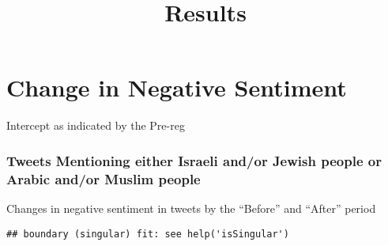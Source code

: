 \documentclass[
  10,
]{article}
\title{Results}
\author{}
\date{\vspace{-2.5em}}
\begin{document}
\maketitle

\section{Change in Negative
Sentiment}\label{change-in-negative-sentiment}

Intercept as indicated by the Pre-reg

\subsubsection{Tweets Mentioning either Israeli and/or Jewish people or
Arabic and/or Muslim
people}\label{tweets-mentioning-either-israeli-andor-jewish-people-or-arabic-andor-muslim-people}

Changes in negative sentiment in tweets by the ``Before'' and ``After''
period

\begin{verbatim}
## boundary (singular) fit: see help('isSingular')
\end{verbatim}
\end{document}
